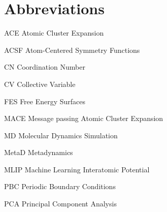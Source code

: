 \section*{Abbreviations}
\begin{mathlist}
\item[\mbox{ACE}] Atomic Cluster Expansion
\item[\mbox{ACSF}] Atom-Centered Symmetry Functions
\item[\mbox{CN}] Coordination Number
\item[\mbox{CV}] Collective Variable
\item[\mbox{FES}] Free Energy Surfaces
\item[\mbox{MACE}] Message passing Atomic Cluster Expansion
\item[\mbox{MD}] Molecular Dynamics Simulation
\item[\mbox{MetaD}] Metadynamics
\item[\mbox{MLIP}] Machine Learning Interatomic Potential
\item[\mbox{PBC}] Periodic Boundary Conditions 
\item[\mbox{PCA}] Principal Component Analysis
\end{mathlist}



%

